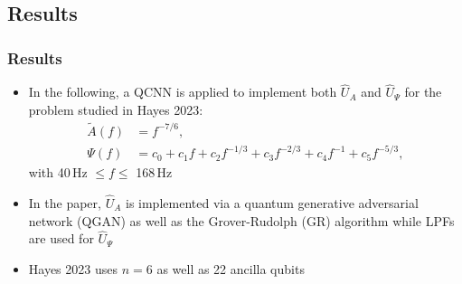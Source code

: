 \documentclass{beamer}
\begin{document}
\begin{frame}
\section{Results}
\frametitle{Results}
\begin{itemize}
\item In the following, a QCNN is applied to implement both $\hat{U}_A$ and $\hat{U}_\Psi$ for the problem studied in Hayes 2023:
\begin{align}
\tilde{A}(f) &= f^{-7/6}, \\
\Psi(f) &= c_0 + c_1 f + c_2 f^{-1/3} + c_3 f^{-2/3} + c_4 f^{-1} + c_5 f^{-5/3},
\end{align}
with 40$\,$Hz $\leq f \leq $ 168$\,$Hz
\item In the paper, $\hat{U}_A$ is implemented via a quantum generative adversarial network (\alert{QGAN}) as well as the Grover-Rudolph (\alert{GR}) algorithm while \alert{LPFs} are used for $\hat{U}_\Psi$
\item Hayes 2023 uses $n=6$ as well as 22 ancilla qubits 
\end{itemize}
\end{frame}
\end{document}

